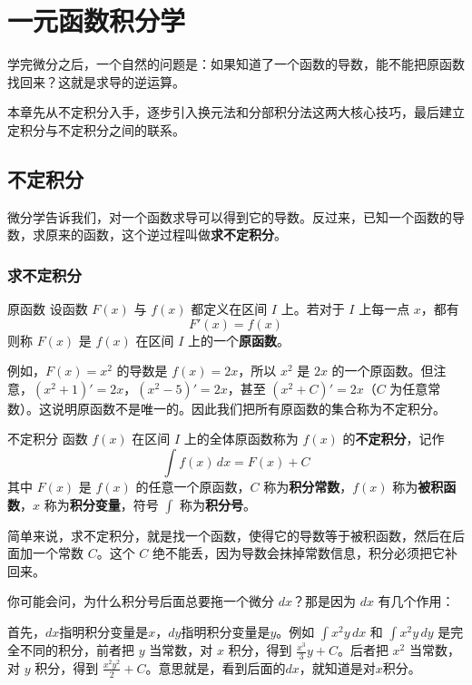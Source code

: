 \chapter{一元函数积分学}

学完微分之后，一个自然的问题是：如果知道了一个函数的导数，能不能把原函数找回来？这就是求导的逆运算。

本章先从不定积分入手，逐步引入换元法和分部积分法这两大核心技巧，最后建立定积分与不定积分之间的联系。

\section{不定积分}
微分学告诉我们，对一个函数求导可以得到它的导数。反过来，已知一个函数的导数，求原来的函数，这个逆过程叫做\textbf{求不定积分}。

\subsection{求不定积分}

\begin{definition}{原函数}{}
设函数 $F(x)$ 与 $f(x)$ 都定义在区间 $I$ 上。若对于 $I$ 上每一点 $x$，都有
\[
F'(x) = f(x)
\]
则称 $F(x)$ 是 $f(x)$ 在区间 $I$ 上的一个\textbf{原函数}。
\end{definition}

例如，$F(x)=x^2$ 的导数是 $f(x)=2x$，所以 $x^2$ 是 $2x$ 的一个原函数。但注意，$(x^2+1)'=2x$，$(x^2-5)'=2x$，甚至 $(x^2+C)'=2x$（$C$ 为任意常数）。这说明原函数不是唯一的。因此我们把所有原函数的集合称为不定积分。

\begin{definition}{不定积分}{}
函数 $f(x)$ 在区间 $I$ 上的全体原函数称为 $f(x)$ 的\textbf{不定积分}，记作
\[
\int f(x)\, dx = F(x) + C
\]
其中 $F(x)$ 是 $f(x)$ 的任意一个原函数，$C$ 称为\textbf{积分常数}，$f(x)$ 称为\textbf{被积函数}，$x$ 称为\textbf{积分变量}，符号 $\int$ 称为\textbf{积分号}。
\end{definition}

简单来说，求不定积分，就是找一个函数，使得它的导数等于被积函数，然后在后面加一个常数 $C$。这个 $C$ 绝不能丢，因为导数会抹掉常数信息，积分必须把它补回来。

你可能会问，为什么积分号后面总要拖一个微分 $dx$？那是因为 $dx$ 有几个作用：

首先，$dx$指明积分变量是$x$，$dy$指明积分变量是$y$。例如 $\int x^2 y\, dx$ 和 $\int x^2 y\, dy$ 是完全不同的积分，前者把 $y$ 当常数，对 $x$ 积分，得到 $\frac{x^3}{3}y+C$。后者把 $x^2$ 当常数，对 $y$ 积分，得到 $\frac{x^2 y^2}{2}+C$。意思就是，看到后面的$dx$，就知道是对$x$积分。

